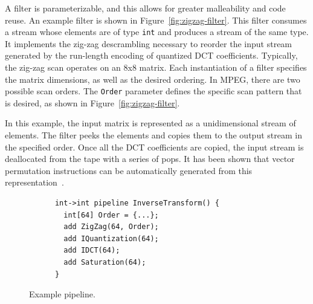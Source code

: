 A filter is parameterizable,
and this allows for greater malleability and code reuse. An example
filter is shown in Figure~\ref{fig:zigzag-filter}. This filter
consumes a stream whose elements are of type {\tt int} and produces a
stream of the same type. It implements the zig-zag descrambling
necessary to reorder the input stream generated by the run-length
encoding of quantized DCT coefficients. Typically, the zig-zag scan
operates on an 8x8 matrix. Each instantiation of a filter specifies the
matrix dimensions, as well as the desired ordering. In MPEG, there are
two possible scan orders. The {\tt Order} parameter defines the
specific scan pattern that is desired, as shown in 
Figure~\ref{fig:zigzag-filter}.

In this example, the input matrix is represented as a unidimensional
stream of elements. The filter peeks the elements and
copies them to the output stream in the specified order. Once all the
DCT coefficients are copied, the input stream is deallocated from the
tape with a series of pops.  It has been shown that vector permutation
instructions can be automatically generated from this
representation~\cite{yelick04msp}.

\begin{figure}[t]
\end{figure}

\begin{figure}[t]
  \begin{scriptsize}
    \begin{verbatim}
      int->int pipeline InverseTransform() {
        int[64] Order = {...};
        add ZigZag(64, Order);
        add IQuantization(64);
        add IDCT(64);
        add Saturation(64);
      }
    \end{verbatim}
  \end{scriptsize}
  \caption{Example pipeline.}
  \label{fig:decoder-pipeline}
\end{figure}

